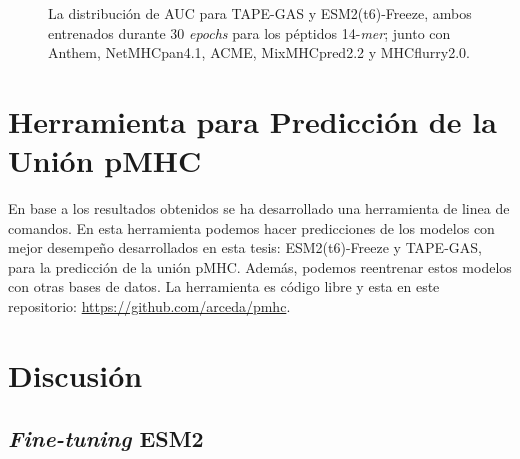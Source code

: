 \begin{figure}[H]
	\centering	
	
	\caption{
		La distribución de AUC para TAPE-GAS y ESM2(t6)-Freeze, ambos entrenados durante 30 \textit{epochs} para los péptidos 14-\textit{mer}; junto con Anthem, NetMHCpan4.1, ACME, MixMHCpred2.2 y MHCflurry2.0.}
	\label{fig:auc_distribution14}
\end{figure}


\section{Herramienta para Predicción de la Unión pMHC}

En base a los resultados obtenidos se ha desarrollado una herramienta de linea de comandos. En esta herramienta podemos hacer predicciones de los modelos con mejor desempeño desarrollados en esta tesis: ESM2(t6)-Freeze y TAPE-GAS, para la predicción de la unión pMHC. Además, podemos reentrenar estos modelos con otras bases de datos. La herramienta es código libre y esta en este repositorio: \href{https://github.com/arceda/pmhc}{https://github.com/arceda/pmhc}.




\section{Discusión}

\subsection{\textit{Fine-tuning} ESM2}

